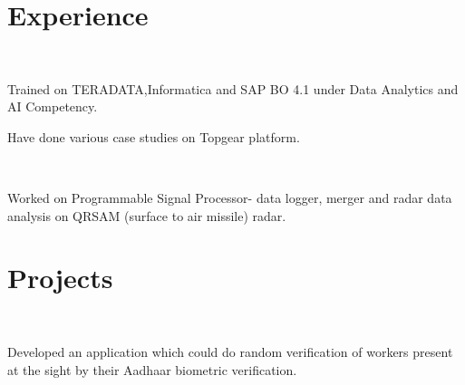 \documentclass[a4paper]{deedy-resume} %
\begin{document}
\begin{minipage}[t]{0.66\textwidth} %


\section{Experience}


\\
\vspace{\topsep} %
\begin{tightitemize}
\item Trained on TERADATA,Informatica and SAP BO 4.1 under Data Analytics and AI Competency.
\item Have done various case studies on Topgear platform.

\end{tightitemize}

\\

\vspace{\topsep} %
\begin{tightitemize}
\item Worked on Programmable Signal Processor- data logger, merger and radar data analysis on QRSAM (surface to air missile) radar.

\end{tightitemize}

\sectionspace %

\section{Projects}

\\

\begin{tightitemize}
\item Developed an application which could do random verification of workers present at the sight by their Aadhaar biometric verification.


\end{tightitemize}
\end{minipage}
\end{document}
